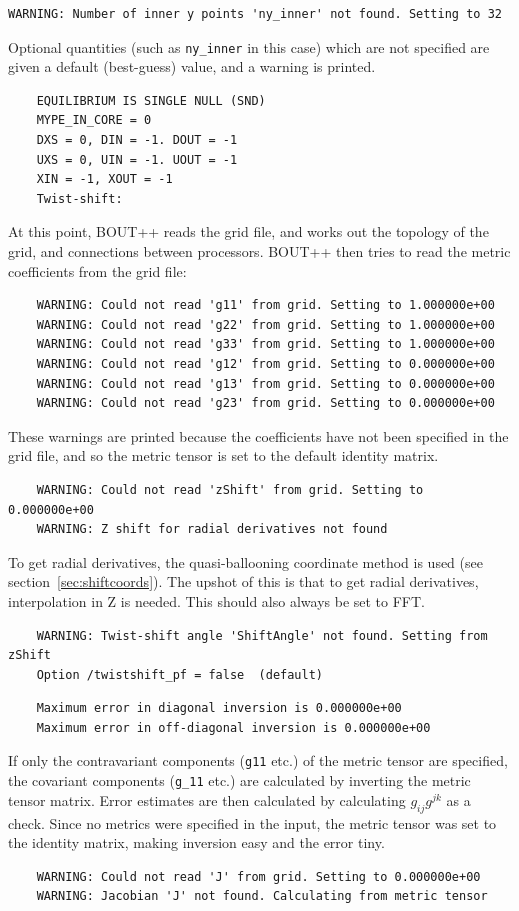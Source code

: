 \documentclass[12pt]{article}
\newcommand{\code}[1]{\texttt{#1}}
\begin{document}
\begin{verbatim}
WARNING: Number of inner y points 'ny_inner' not found. Setting to 32
\end{verbatim}
Optional quantities (such as \code{ny\_inner} in this case) which
are not specified are given a default (best-guess) value, and a warning is printed.
\begin{verbatim}
	EQUILIBRIUM IS SINGLE NULL (SND) 
	MYPE_IN_CORE = 0
	DXS = 0, DIN = -1. DOUT = -1
	UXS = 0, UIN = -1. UOUT = -1
	XIN = -1, XOUT = -1
	Twist-shift: 
\end{verbatim}
At this point, BOUT++ reads the grid file, and works out the topology of the grid,
and connections between processors.
BOUT++ then tries to read the metric coefficients from the grid file:
\begin{verbatim}
	WARNING: Could not read 'g11' from grid. Setting to 1.000000e+00
	WARNING: Could not read 'g22' from grid. Setting to 1.000000e+00
	WARNING: Could not read 'g33' from grid. Setting to 1.000000e+00
	WARNING: Could not read 'g12' from grid. Setting to 0.000000e+00
	WARNING: Could not read 'g13' from grid. Setting to 0.000000e+00
	WARNING: Could not read 'g23' from grid. Setting to 0.000000e+00
\end{verbatim}

These warnings are printed because the coefficients have not been specified in the 
grid file, and so the metric tensor is set to the default identity matrix.

\begin{verbatim}
	WARNING: Could not read 'zShift' from grid. Setting to 0.000000e+00
	WARNING: Z shift for radial derivatives not found
\end{verbatim}
To get radial derivatives, the quasi-ballooning coordinate method is used (see
section~\ref{sec:shiftcoords}). The upshot of this is that to get radial derivatives,
interpolation in Z is needed. This should also always be set to FFT.

\begin{verbatim}
	WARNING: Twist-shift angle 'ShiftAngle' not found. Setting from zShift
	Option /twistshift_pf = false  (default)
\end{verbatim}

\begin{verbatim}
	Maximum error in diagonal inversion is 0.000000e+00
	Maximum error in off-diagonal inversion is 0.000000e+00
\end{verbatim}
If only the contravariant components (\code{g11} etc.) of the metric tensor are specified,
the covariant components (\code{g\_11} etc.) are calculated by inverting the metric tensor matrix. 
Error estimates are then calculated by calculating $g_{ij}g^{jk}$ as a check.
Since no metrics were specified in the input, the metric tensor was set to the identity
matrix, making inversion easy and the error tiny.
\begin{verbatim}
	WARNING: Could not read 'J' from grid. Setting to 0.000000e+00
	WARNING: Jacobian 'J' not found. Calculating from metric tensor
\end{verbatim}
\end{document}
